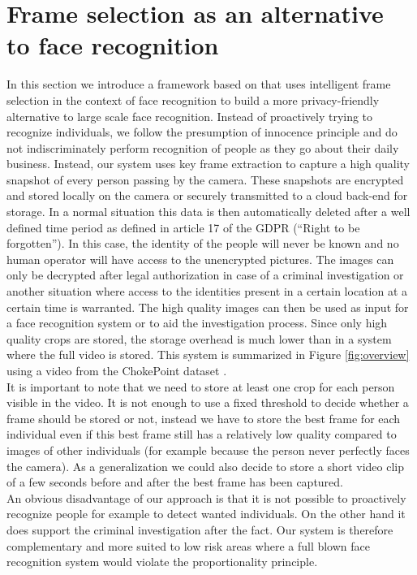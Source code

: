\documentclass[letterpaper]{article} %
\begin{document}
\section{Frame selection as an alternative to face recognition}
\label{section:privacy_preserving_appr}
In this section we introduce a framework based on \cite{simoens2013scalable} that uses intelligent frame selection in the context of face recognition to build a more privacy-friendly alternative to large scale face recognition. Instead of proactively trying to recognize individuals, we follow the presumption of innocence principle and do not indiscriminately perform recognition of people as they go about their daily business. Instead, our system uses key frame extraction to capture a high quality snapshot of every person passing by the camera. These snapshots are encrypted and stored locally on the camera or securely transmitted to a cloud back-end for storage. In a normal situation this data is then automatically deleted after a well defined time period as defined in article 17 of the GDPR (``Right to be forgotten''). In this case, the identity of the people will never be known and no human operator will have access to the unencrypted pictures. The images can only be decrypted after legal authorization in case of a criminal investigation or another situation where access to the identities present in a certain location at a certain time is warranted. The high quality images can then be used as input for a face recognition system or to aid the investigation process. Since only high quality crops are stored, the storage overhead is much lower than in a system where the full video is stored. This system is summarized in Figure \ref{fig:overview} using a video from the ChokePoint dataset \cite{wong_cvprw_2011}.
\\
\newline
It is important to note that we need to store at least one crop for each person visible in the video. It is not enough to use a fixed threshold to decide whether a frame should be stored or not, instead we have to store the best frame for each individual even if this best frame still has a relatively low quality compared to images of other individuals (for example because the person never perfectly faces the camera). As a generalization we could also decide to store a short video clip of a few seconds before and after the best frame has been captured.
\\
\newline
An obvious disadvantage of our approach is that it is not possible to proactively recognize people for example to detect wanted individuals. On the other hand it does support the criminal investigation after the fact. Our system is therefore complementary and more suited to low risk areas where a full blown face recognition system would violate the proportionality principle.
\end{document}
